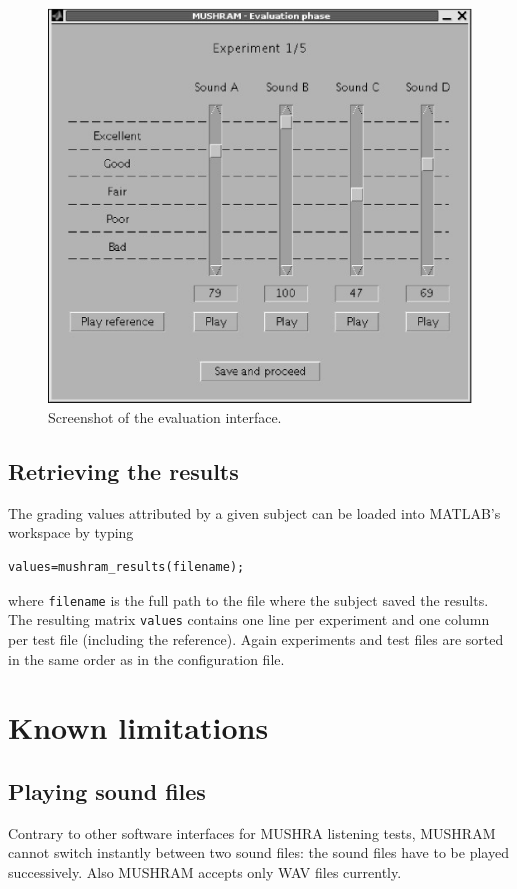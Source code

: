 \documentclass[11pt,a4paper]{book}
\begin{document}
\begin{figure}[htbp]
\centering
\includegraphics[scale=0.75]{evaluation_screenshot.eps}
\caption{Screenshot of the evaluation interface.}
\label{fig:evaluation}
\end{figure}

\section{Retrieving the results}
The grading values attributed by a given subject can be loaded into MATLAB's workspace by typing
\begin{verbatim}
values=mushram_results(filename);
\end{verbatim}
where \texttt{filename} is the full path to the file where the subject saved the results. The resulting matrix \texttt{values} contains one line per experiment and one column per test file (including the reference). Again experiments and test files are sorted in the same order as in the configuration file.
\vfill

\chapter{Known limitations}
\section{Playing sound files}
Contrary to other software interfaces for MUSHRA listening tests, MUSHRAM cannot switch instantly between two sound files: the sound files have to be played successively. Also MUSHRAM accepts only WAV files currently.
\end{document}
